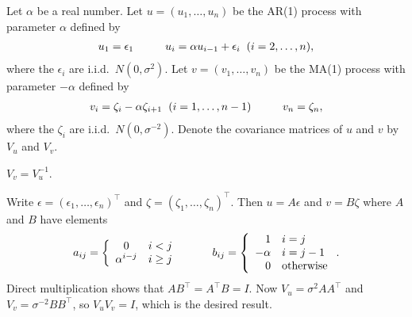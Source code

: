 \documentclass[preprint,12pt,authoryear]{elsarticle}
\begin{document}
Let $\alpha$ be a real number. Let $u=(u_1,\ldots,u_n)$ be the AR(1) process with parameter $\alpha$ defined by
\begin{eqnarray*}
	u_{1} = \epsilon_1 \hspace{10mm}
	u_{i} = \alpha u_{i-1} + \epsilon_i  \hspace{2mm}(i=2,\ldots,n),
\end{eqnarray*}
where the $\epsilon_i$ are i.i.d.\  $N(0,\sigma^2)$.
Let $v=(v_1,\ldots,v_n)$ be the MA(1) process with parameter $-\alpha$ defined by
\begin{eqnarray*}
	v_{i} = \zeta_i - \alpha\zeta_{i+1}  \hspace{2mm}(i=1,\ldots,n-1)\hspace{10mm}
	v_{n} = \zeta_n,
\end{eqnarray*}
where the $\zeta_i$ are i.i.d.\  $N(0,\sigma^{-2})$.
Denote the covariance matrices of $u$ and $v$ by $V_u$ and $V_v$.
\begin{lemma}\label{lem-ar}
	$V_v=V_u^{-1}$.
\end{lemma}
\proof
Write $\epsilon=(\epsilon_1,\ldots,\epsilon_n)^\top$ and $\zeta=(\zeta_1,\ldots,\zeta_n)^\top$. Then
$u=A\epsilon$ and $v=B\zeta$ where $A$ and $B$ have elements
\[  a_{ij} = \left\{ \begin{array}{cl} 0 & i<j \\ \alpha^{i-j} & i\ge j \end{array}  \right.
\hspace{10mm}
b_{ij} = \left\{ \begin{array}{rl} 1 & i=j \\ -\alpha & i=j-1 \\ 0 & \text{otherwise} \end{array}  \right. . \]
Direct multiplication shows that $AB^\top=A^\top B=I$. Now $V_u=\sigma^2AA^\top$ and $V_v=\sigma^{-2}BB^\top$, so $V_uV_v=I$, which is the desired result.
\endproof











%
%
\end{document}
